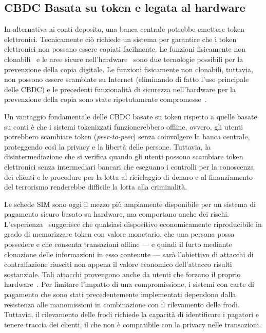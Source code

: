 \documentclass{article}
\begin{document}


\subsection{CBDC Basata su token e legata al hardware}
\label{cbdc-basata-su-token-e-legata-al-hardware}

In alternativa ai conti deposito, una banca centrale potrebbe emettere
token elettronici. Tecnicamente ciò richiede un sistema per garantire che
i token elettronici non possano essere copiati facilmente. Le funzioni
fisicamente non clonabili~\cite[vedi][]{Katzenbeisser} e le aree
sicure nell'hardware~\cite[vedi][]{Alves,Pinto} sono due tecnologie
possibili per la prevenzione della copia digitale. Le funzioni
fisicamente non clonabili, tuttavia, non possono essere scambiate su
Internet (eliminando di fatto l'uso principale delle CBDC) e le precedenti
funzionalità di sicurezza nell'hardware per la prevenzione della copia
sono state ripetutamente compromesse~\cite[si veda, ad esempio,][]{Wojtczuk,Johnston,Lapid}.

Un vantaggio fondamentale delle CBDC basate su token rispetto a quelle
basate su conti è che i sistemi tokenizzati funzionerebbero offline,
ovvero, gli utenti potrebbero scambiare token (\textit{peer-to-peer})
senza coinvolgere la banca centrale, proteggendo così la privacy e la
libertà delle persone. Tuttavia, la disintermediazione che si verifica
quando gli utenti possono scambiare token elettronici senza
intermediari bancari che eseguano i controlli per la conoscenza dei
clienti e le procedure per la lotta al riciclaggio di denaro e al
finanziamento del terrorismo renderebbe difficile la lotta alla
criminalità.

Le schede SIM sono oggi il mezzo più ampiamente disponibile per un
sistema di pagamento sicuro basato su hardware, ma comportano anche
dei rischi. L'esperienza~\cite[si veda, ad esempio,][]{Soukup,Garcia,Kasper,CCC}
suggerisce che qualsiasi dispositivo economicamente riproducibile in grado
di memorizzare token con valore monetario, che una persona possa possedere
e che consenta transazioni offline --- e quindi il furto mediante
clonazione delle informazioni in esso contenute --- sarà l'obiettivo di
attacchi di contraffazione riusciti non appena il valore economico
dell'attacco risulti sostanziale. Tali attacchi provengono anche da
utenti che forzano il proprio hardware~\cite[vedi][]{Allen}. Per
limitare l'impatto di una compromissione, i sistemi con carte di pagamento
che sono stati precedentemente implementati dependono dalla resistenza
alle manomissioni in combinazione con il rilevamento delle frodi.
Tuttavia, il rilevamento delle frodi richiede la capacità di identificare
i pagatori e tenere traccia dei clienti, il che non è compatibile con la
privacy nelle transazioni.
\end{document}
